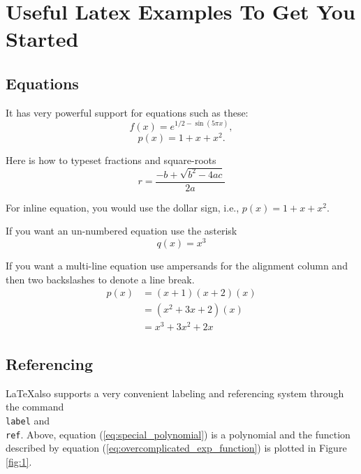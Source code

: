 \documentclass[12pt]{article}
\begin{document}
\section*{Useful Latex Examples To Get You Started}

\subsection{Equations}
It has very powerful support for equations such as these:
\begin{equation}
f(x) = e^{1/2 - \sin(5 \pi    x)}, \label{eq:overcomplicated_exp_function} 
\end{equation}
\begin{equation}
p(x) = 1+x+x^2. \label{eq:special_polynomial} 
\end{equation}

\noindent
Here is how to typeset fractions and square-roots
\begin{equation}
    r = \frac{-b + \sqrt{b^2 - 4ac}}{2a}
\end{equation}

\noindent
For inline equation, you would use the dollar sign, i.e., $p(x) = 1 + x + x^2$.

\noindent
If you want an un-numbered equation use the asterisk
\begin{equation*}
    q(x) = x^3
\end{equation*}

\noindent
If you want a multi-line equation use ampersands for the alignment column and then two backslashes to denote a line break.
\begin{align}
   p(x) & = (x + 1)(x + 2)(x) \\
        & = (x^2 + 3x + 2)(x) \\
        & = x^3 + 3x^2 + 2x
\end{align}

\subsection{Referencing}
\LaTeX also supports a very convenient labeling and referencing system
through the command \texttt{\\label} and \texttt{\\ref}.  Above, equation
(\ref{eq:special_polynomial}) is a polynomial and the function described by equation
(\ref{eq:overcomplicated_exp_function}) is plotted in Figure \ref{fig:1}. 
\end{document}
